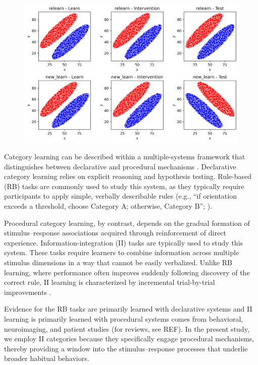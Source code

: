 \documentclass{article}
\begin{document}
\begin{figure}[H]
    \centering
    \includegraphics[width=\textwidth]{../figures/fig_cat_struct.png}
    \caption{}
    \label{fig_cat}
\end{figure}

Category learning can be described within a multiple-systems
framework that distinguishes between declarative and
procedural mechanisms \citep{ashby1998differentiating,
ashby2017multiple}.  Declarative category learning relies on
explicit reasoning and hypothesis testing. Rule-based (RB)
tasks are commonly used to study this system, as they
typically require participants to apply simple, verbally
describable rules (e.g., ``if orientation exceeds a
threshold, choose Category A; otherwise, Category B'';
\citealp{filoteo2005, nomura2007neural}).

Procedural category learning, by contrast, depends on the
gradual formation of stimulus--response associations
acquired through reinforcement of direct experience.
Information-integration (II) tasks are typically used to
study this system. These tasks require learners to combine
information across multiple stimulus dimensions in a way
that cannot be easily verbalized. Unlike RB learning, where
performance often improves suddenly following discovery of
the correct rule, II learning is characterized by
incremental trial-by-trial improvements
\citep{maddox2004dissociating, ashby2011}.

Evidence for the RB tasks are primarily learned with
declarative systems and II learning is primarily learned
with procedural systems comes from behavioral, neuroimaging,
and patient studies (for reviews, see REF). In the present
study, we employ II categories because they specifically
engage procedural mechanisms, thereby providing a window
into the stimulus--response processes that underlie broader
habitual behaviors.
\end{document}
